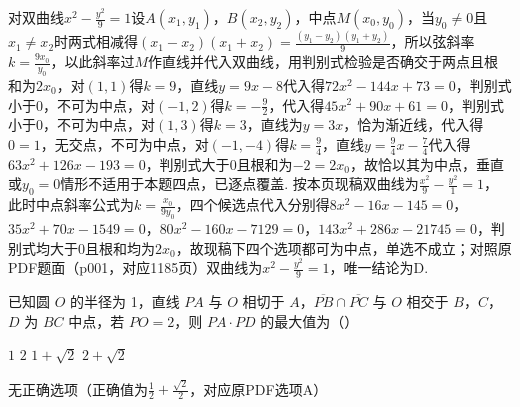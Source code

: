 \begin{solution}
对双曲线\(x^{2}-\frac{y^{2}}{9}=1\)设\(A\left(x_{1},y_{1}\right)\)，\(B\left(x_{2},y_{2}\right)\)，中点\(M\left(x_{0},y_{0}\right)\)，当\(y_{0}\ne0\)且\(x_{1}\ne x_{2}\)时两式相减得\(\left(x_{1}-x_{2}\right)\left(x_{1}+x_{2}\right)=\frac{\left(y_{1}-y_{2}\right)\left(y_{1}+y_{2}\right)}{9}\)，所以弦斜率\(k=\frac{9x_{0}}{y_{0}}\)，以此斜率过\(M\)作直线并代入双曲线，用判别式检验是否确交于两点且根和为\(2x_{0}\)，对\(\left(1,1\right)\)得\(k=9\)，直线\(y=9x-8\)代入得\(72x^{2}-144x+73=0\)，判别式小于\(0\)，不可为中点，对\(\left(-1,2\right)\)得\(k=-\frac{9}{2}\)，代入得\(45x^{2}+90x+61=0\)，判别式小于\(0\)，不可为中点，对\(\left(1,3\right)\)得\(k=3\)，直线为\(y=3x\)，恰为渐近线，代入得\(0=1\)，无交点，不可为中点，对\(\left(-1,-4\right)\)得\(k=\frac{9}{4}\)，直线\(y=\frac{9}{4}x-\frac{7}{4}\)代入得\(63x^{2}+126x-193=0\)，判别式大于\(0\)且根和为\(-2=2x_{0}\)，故恰以其为中点，垂直或\(y_{0}=0\)情形不适用于本题四点，已逐点覆盖. 按本页现稿双曲线为\(\frac{x^{2}}{9}-\frac{y^{2}}{1}=1\)，此时中点斜率公式为\(k=\frac{x_{0}}{9y_{0}}\)，四个候选点代入分别得\(8x^{2}-16x-145=0\)，\(35x^{2}+70x-1549=0\)，\(80x^{2}-160x-7129=0\)，\(143x^{2}+286x-21745=0\)，判别式均大于\(0\)且根和均为\(2x_{0}\)，故现稿下四个选项都可为中点，单选不成立；对照原PDF题面（p001，对应1185页）双曲线为\(x^{2}-\frac{y^{2}}{9}=1\)，唯一结论为D.
\end{solution}

\begin{problem}
已知圆 \(O\) 的半径为 1，直线 \(PA\) 与 \(O\) 相切于 \(A\)，\(\overline{PB}\cap\overline{PC}\) 与 \(O\) 相交于 \(B\)，\(C\)，\(D\) 为 \(BC\) 中点，若 \(PO=2\)，则 \(PA\cdot PD\) 的最大值为（\quad）

\choices
    {\(1\)}
    {\(2\)}
    {\(1+\sqrt2\)}
    {\(2+\sqrt2\)}
\end{problem}

\begin{answer}
无正确选项（正确值为\(\frac{1}{2}+\frac{\sqrt{2}}{2}\)，对应原PDF选项A）
\end{answer}

